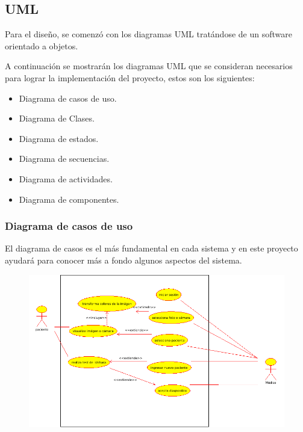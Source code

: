 \documentclass[10pt]{article}
\begin{document}
\subsection{UML}
Para el diseño, se comenzó con los diagramas UML tratándose de un software orientado a objetos.

A continuación se mostrarán los diagramas UML que se consideran necesarios para lograr la implementación del proyecto, estos son los siguientes:

\begin{itemize}
    \item Diagrama de casos de uso.
    \item Diagrama de Clases.
    \item Diagrama de estados.
    \item Diagrama de secuencias.
    \item Diagrama de actividades. 
    \item Diagrama de componentes.
\end{itemize}

\subsubsection{Diagrama de casos de uso}

El diagrama de casos es el más fundamental en cada sistema y en este proyecto ayudará para conocer más a fondo algunos aspectos del sistema.

\begin{figure}[H]
	\begin{center}
\includegraphics[scale = 0.60]{UML/casos.png}
	\end{center} 
\end{figure}
\end{document}
